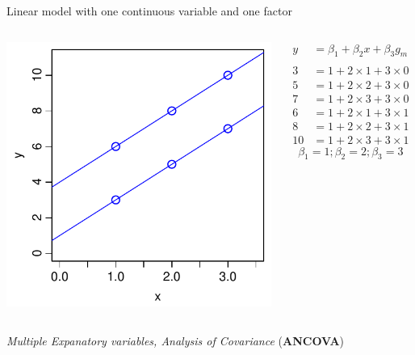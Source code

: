 \documentclass[xcolor=x11names,compress]{beamer}
\renewcommand{\(}{\begin{columns}}
\renewcommand{\)}{\end{columns}}
\newcommand{\<}[1]{\begin{column}{#1}}
\renewcommand{\>}{\end{column}}
\begin{document}
\begin{frame}{Linear model with one continuous variable and one factor}

    \begin{columns}[T]
    
            \includegraphics[width=\textwidth]{TwoVars.pdf}
            
            \begin{align*}
              y  &= \beta_1  + \beta_2 x + \beta_3 g_m\\
              \\
              3   &= 1 + 2 \times 1 + 3 \times 0\\
              5   &= 1 + 2 \times 2 + 3 \times 0\\
              7   &= 1 + 2 \times 3 + 3 \times 0\\
              6   &= 1 + 2 \times 1 + 3 \times 1\\  
              8   &= 1 + 2 \times 2 + 3 \times 1\\
              10  &= 1 + 2 \times 3 + 3 \times 1
            \end{align*}
            \[\beta_1 = 1; \beta_2=2; \beta_3=3\]
    \end{columns}
    \pause
    \begin{center}
        {\it Multiple Expanatory variables, Analysis of Covariance} ({\bf ANCOVA})
    \end{center}
\end{frame}
   
\end{document}
